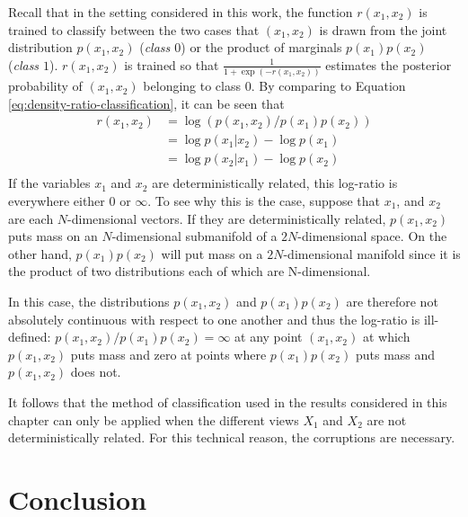 Recall that in the setting considered in this work, the function $r(x_1, x_2)$ is trained to classify between the two cases that $(x_1, x_2)$ is drawn from the joint distribution $p(x_1, x_2)$ (\emph{class $0$}) or the product of marginals $p(x_1) p(x_2)$ (\emph{class $1$}).
$r(x_1, x_2)$ is trained so that $\frac{1}{1 + \exp(-r(x_1, x_2))}$ estimates the posterior probability of $(x_1, x_2)$ belonging to class 0.
By comparing to Equation \ref{eq:density-ratio-classification}, it can be seen that
%
\begin{align*}
r(x_1, x_2) &= \log \left( p(x_1, x_2) / p(x_1) p(x_2)\right) \\
&= \log p(x_1 | x_2)  - \log p(x_1) \\
&= \log p(x_2 | x_1)  - \log p(x_2) \\
\end{align*}
%
If the variables $x_1$ and $x_2$ are deterministically related, this log-ratio is everywhere either $0$ or $\infty$.
To see why this is the case, suppose that $x_1$, and $x_2$ are each $N$-dimensional vectors.
If they are deterministically related, $p(x_1, x_2)$ puts mass on an $N$-dimensional submanifold of a $2N$-dimensional space.
On the other hand, $p(x_1)p(x_2)$ will put mass on a $2N$-dimensional manifold since it is the product of two distributions each of which are N-dimensional.

In this case, the distributions $p(x_1, x_2)$ and $p(x_1)p(x_2)$ are therefore not absolutely continuous with respect to one another and thus the log-ratio is ill-defined: $p(x_1, x_2)/p(x_1)p(x_2) = \infty$ at any point $(x_1,x_2)$ at which $p(x_1, x_2)$ puts mass and zero at points where $p(x_1)p(x_2)$ puts mass and $p(x_1,x_2)$ does not.

It follows that the method of classification used in the results considered in this chapter can only be applied when the different views $X_1$ and $X_2$ are not deterministically related.
For this technical reason, the corruptions are necessary.



\section{Conclusion}
\label{sec:on_suffistv}

